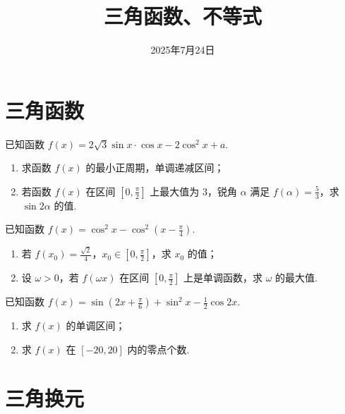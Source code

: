 \documentclass[a4paper , final]{ctexart}
\title{三角函数、不等式}
\date{2025年7月24日}
\newenvironment{problem}[1]{%
  \item #1
  \par
  \vspace{8cm}
}{}
\begin{document}
\maketitle

\section*{三角函数}

\begin{problems}
  \begin{problem}
  {
    已知函数 $f(x) = 2\sqrt{3}\sin x\cdot\cos x - 2\cos^2 x + a$.
    \begin{enumerate}[label=(\arabic*)]
      \item 求函数 $f(x)$ 的最小正周期，单调递减区间；
      \item 若函数 $f(x)$ 在区间 $\left[0, \frac{\pi}{2}\right]$ 上最大值为 $3$，锐角 $\alpha$ 满足 $f(\alpha) = \frac{5}{3}$，求 $\sin 2\alpha$ 的值.
    \end{enumerate}
  }
\end{problem}

\begin{problem}
  {
    已知函数 $f(x) = \cos^2 x - \cos^2\left(x - \frac{\pi}{4}\right)$.
    \begin{enumerate}[label=(\arabic*)]
      \item 若 $f(x_0) = \frac{\sqrt{2}}{4}$，$x_0 \in \left[0, \frac{\pi}{2}\right]$，求 $x_0$ 的值；
      \item 设 $\omega > 0$，若 $f(\omega x)$ 在区间 $\left[0, \frac{\pi}{2}\right]$ 上是单调函数，求 $\omega$ 的最大值.
    \end{enumerate}
  }
\end{problem}

\begin{problem}
  {
    已知函数 $f(x) = \sin\left(2x + \frac{\pi}{6}\right) + \sin^2 x - \frac{1}{2}\cos 2x$.
    \begin{enumerate}[label=(\Roman*)]
      \item 求 $f(x)$ 的单调区间；
      \item 求 $f(x)$ 在 $[-20, 20]$ 内的零点个数.
    \end{enumerate}
  }
\end{problem}

\end{problems}
\newpage
\section*{三角换元}
\end{document}
